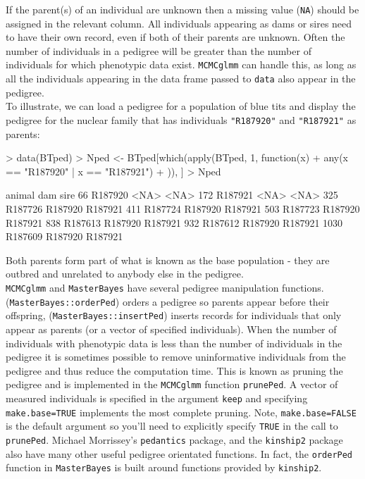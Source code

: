 \documentclass{article}
\begin{document}
If the parent(s) of an individual are unknown then a missing value (\texttt{NA}) should be assigned in the relevant column. All individuals appearing as dams or sires need to have their own record, even if both of their parents are unknown. Often the number of individuals in a pedigree will be greater than the number of individuals for which phenotypic data exist. \texttt{MCMCglmm} can handle this, as long as all the individuals appearing in the data frame passed to \texttt{data} also appear in the pedigree.\\
   
To illustrate, we can load a pedigree for a population of blue tits and display the pedigree for the nuclear family that has individuals \texttt{"R187920"} and \texttt{"R187921"} as parents:

\begin{Schunk}
\begin{Sinput}
> data(BTped)
> Nped <- BTped[which(apply(BTped, 1, function(x) {
+     any(x == "R187920" | x == "R187921")
+ })), ]
> Nped
\end{Sinput}
\begin{Soutput}
      animal     dam    sire
66   R187920    <NA>    <NA>
172  R187921    <NA>    <NA>
325  R187726 R187920 R187921
411  R187724 R187920 R187921
503  R187723 R187920 R187921
838  R187613 R187920 R187921
932  R187612 R187920 R187921
1030 R187609 R187920 R187921
\end{Soutput}
\end{Schunk}

Both parents form part of what is known as the base population - they are outbred and unrelated to anybody else in the pedigree.\\

\texttt{MCMCglmm} and \texttt{MasterBayes} have several pedigree manipulation functions. (\texttt{MasterBayes::orderPed})  orders a pedigree so parents appear before their offspring, (\texttt{MasterBayes::insertPed}) inserts records for individuals that only appear as parents (or a vector of specified individuals).  When the number of individuals with phenotypic data is less than the number of individuals in the pedigree it is sometimes possible to remove uninformative individuals from the pedigree and thus reduce the computation time. This is known as pruning the pedigree and is implemented in the  \texttt{MCMCglmm} function \texttt{prunePed}. A vector of measured individuals is specified in the argument \texttt{keep} and specifying \texttt{make.base=TRUE} implements the most complete pruning. Note,  \texttt{make.base=FALSE} is the default argument so you'll need to explicitly specify \texttt{TRUE} in the call to  \texttt{prunePed}. Michael Morrissey's \texttt{pedantics} package, and the \texttt{kinship2} package also have many other useful pedigree orientated functions. In fact, the \texttt{orderPed} function in \texttt{MasterBayes} is built around functions provided by  \texttt{kinship2}.\\
\end{document}

